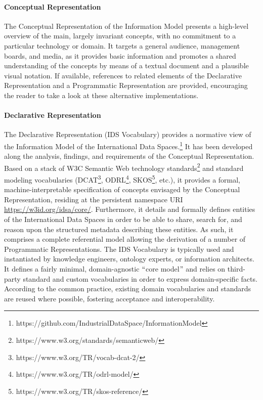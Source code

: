 \paragraph{Conceptual Representation \\}
The Conceptual Representation of the Information Model presents a high-level overview of the main, largely invariant concepts, with no commitment to a particular technology or domain. It targets a general audience, management boards, and media, as it provides basic information and promotes a shared understanding of the concepts by means of a textual document and a plausible visual notation. If available, references to related elements of the Declarative Representation and a Programmatic Representation are provided, encouraging the reader to take a look at these alternative implementations.

\paragraph{Declarative Representation\\}
The Declarative Representation (IDS Vocabulary) provides a normative view of the Information Model of the International Data Spaces.\footnote{https://github.com/IndustrialDataSpace/InformationModel }
It has been developed along the analysis, findings, and requirements of the Conceptual Representation. Based on a stack of W3C Semantic Web technology standards\footnote{https://www.w3.org/standards/semanticweb/ } and standard modeling vocabularies (DCAT\footnote{https://www.w3.org/TR/vocab-dcat-2/ }, ODRL\footnote{https://www.w3.org/TR/odrl-model/ }, SKOS\footnote{https://www.w3.org/TR/skos-reference/ }, etc.), it provides a formal, machine-interpretable specification of concepts envisaged by the Conceptual Representation, residing at the persistent namespace URI \url{https://w3id.org/idsa/core/}. Furthermore, it details and formally defines entities of the International Data Spaces in order to be able to share, search for, and reason upon the structured metadata describing these entities. As such, it comprises a complete referential model allowing the derivation of a number of Programmatic Representations. The IDS Vocabulary is typically used and instantiated by knowledge engineers, ontology experts, or information architects. It defines a fairly minimal, domain-agnostic $``$core model$"$  and relies on third-party standard and custom vocabularies in order to express domain-specific facts. According to the common practice, existing domain vocabularies and standards are reused where possible, fostering acceptance and interoperability.


